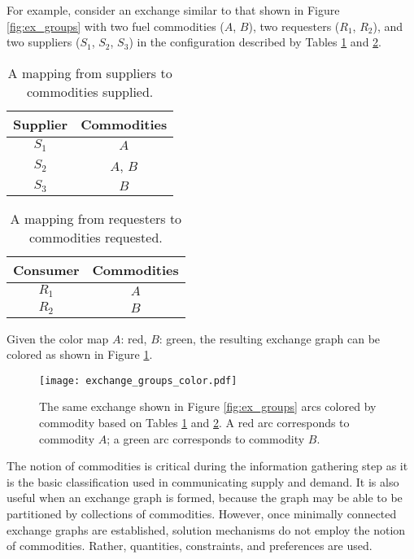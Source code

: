 For example, consider an exchange similar to that shown in Figure
\ref{fig:ex_groups} with two fuel commodities ($A$, $B$), two requesters ($R_1$,
$R_2$), and two suppliers ($S_1$, $S_2$, $S_3$) in the configuration described
by Tables \ref{tbl:ex_sup} and \ref{tbl:ex_req}.

\begin{table}[h]
\centering
\begin{tabular}{c|c}
Supplier & Commodities \\ \hline
$S_1$             & $A$         \\
$S_2$             & $A$, $B$    \\
$S_3$             & $B$         \\
\end{tabular}
\caption{A mapping from suppliers to commodities supplied.}
\label{tbl:ex_sup}
\end{table}

\begin{table}[h]
\centering
\begin{tabular}{c|c}
Consumer & Commodities \\ \hline
$R_1$             & $A$         \\
$R_2$             & $B$        
\end{tabular}
\caption{A mapping from requesters to commodities requested.}
\label{tbl:ex_req}
\end{table}

Given the color map $A$: red, $B$: green, the resulting exchange
graph can be colored as shown in Figure \ref{fig:ex_groups_color}.

\begin{figure}
  \begin{center}
    \texttt{[image: exchange\_groups\_color.pdf]}
    \caption{The same exchange shown in Figure \ref{fig:ex_groups} arcs colored
      by commodity based on Tables \ref{tbl:ex_sup} and \ref{tbl:ex_req}. A red
      arc corresponds to commodity $A$; a green arc corresponds to commodity
      $B$.}
    \label{fig:ex_groups_color}
  \end{center}
\end{figure}

The notion of commodities is critical during the information gathering step as
it is the basic classification used in communicating supply and demand. It is
also useful when an exchange graph is formed, because the graph may be able to
be partitioned by collections of commodities. However, once minimally connected
exchange graphs are established, solution mechanisms do not employ the notion of
commodities. Rather, quantities, constraints, and preferences are used.

